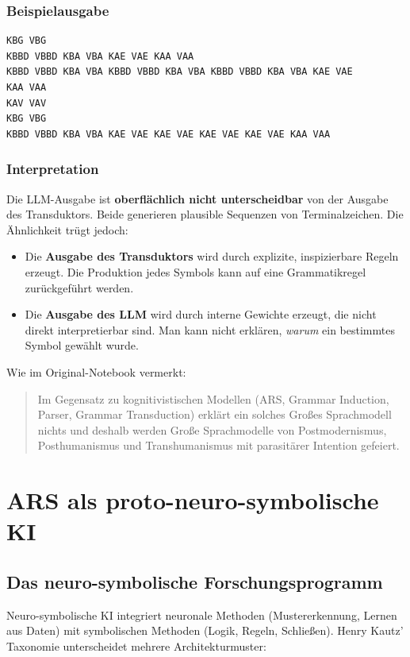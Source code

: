 \documentclass[12pt,a4paper]{article}
\begin{document}
\subsubsection{Beispielausgabe}

\begin{verbatim}
KBG VBG 
KBBD VBBD KBA VBA KAE VAE KAA VAA 
KBBD VBBD KBA VBA KBBD VBBD KBA VBA KBBD VBBD KBA VBA KAE VAE 
KAA VAA 
KAV VAV 
KBG VBG 
KBBD VBBD KBA VBA KAE VAE KAE VAE KAE VAE KAE VAE KAA VAA 
\end{verbatim}

\subsubsection{Interpretation}

Die LLM-Ausgabe ist \textbf{oberflächlich nicht unterscheidbar} von der 
Ausgabe des Transduktors. Beide generieren plausible Sequenzen von 
Terminalzeichen. Die Ähnlichkeit trügt jedoch:

\begin{itemize}
    \item Die \textbf{Ausgabe des Transduktors} wird durch explizite, 
    inspizierbare Regeln erzeugt. Die Produktion jedes Symbols kann auf eine 
    Grammatikregel zurückgeführt werden.
    \item Die \textbf{Ausgabe des LLM} wird durch interne Gewichte erzeugt, die 
    nicht direkt interpretierbar sind. Man kann nicht erklären, \textit{warum} 
    ein bestimmtes Symbol gewählt wurde.
\end{itemize}

Wie im Original-Notebook vermerkt:

\blockquote{Im Gegensatz zu kognitivistischen Modellen (ARS, Grammar Induction, 
Parser, Grammar Transduction) erklärt ein solches Großes Sprachmodell nichts 
und deshalb werden Große Sprachmodelle von Postmodernismus, Posthumanismus und 
Transhumanismus mit parasitärer Intention gefeiert.}

\section{ARS als proto-neuro-symbolische KI}

\subsection{Das neuro-symbolische Forschungsprogramm}

Neuro-symbolische KI integriert neuronale Methoden (Mustererkennung, Lernen aus 
Daten) mit symbolischen Methoden (Logik, Regeln, Schließen). Henry Kautz' 
Taxonomie \citep{kautz2020third} unterscheidet mehrere Architekturmuster:
\end{document}
